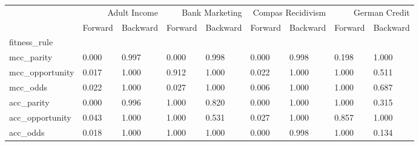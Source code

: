 \begin{tabular}{lllllllll}
\toprule
 & \multicolumn{2}{r}{Adult Income} & \multicolumn{2}{r}{Bank Marketing} & \multicolumn{2}{r}{Compas Recidivism} & \multicolumn{2}{r}{German Credit} \\
 & Forward & Backward & Forward & Backward & Forward & Backward & Forward & Backward \\
fitness_rule &  &  &  &  &  &  &  &  \\
\midrule
mcc_parity & 0.000 & 0.997 & 0.000 & 0.998 & 0.000 & 0.998 & 0.198 & 1.000 \\
mcc_opportunity & 0.017 & 1.000 & 0.912 & 1.000 & 0.022 & 1.000 & 1.000 & 0.511 \\
mcc_odds & 0.022 & 1.000 & 0.027 & 1.000 & 0.006 & 1.000 & 1.000 & 0.687 \\
acc_parity & 0.000 & 0.996 & 1.000 & 0.820 & 0.000 & 1.000 & 1.000 & 0.315 \\
acc_opportunity & 0.043 & 1.000 & 1.000 & 0.531 & 0.027 & 1.000 & 0.857 & 1.000 \\
acc_odds & 0.018 & 1.000 & 1.000 & 1.000 & 0.000 & 0.998 & 1.000 & 0.134 \\
\bottomrule
\end{tabular}
